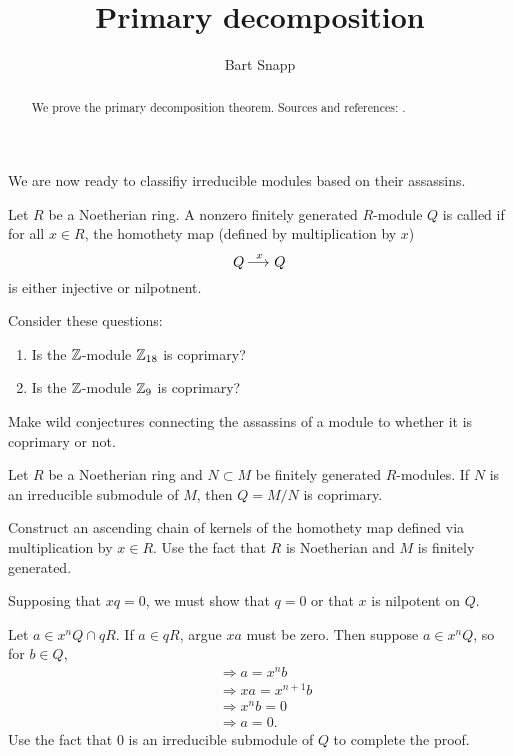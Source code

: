 \documentclass{ximera}
\author{Bart Snapp}
\title{Primary decomposition}
\begin{document}
\begin{abstract}
  We prove the primary decomposition theorem. Sources and references:
  \cite{AM1969, sD2008, dE1995, mR1995}.
\end{abstract}
\maketitle


We are now ready to classifiy irreducible modules based on their
assassins.

\begin{definition}
  Let $R$ be a Noetherian ring. A nonzero finitely generated
  $R$-module $Q$ is called  if for all $x\in R$, the
  homothety map (defined by multiplication by $x$)
  \[
  Q\mathop{\longrightarrow\,}\limits^x Q
  \]
  is either injective or nilpotnent.
\end{definition}

\begin{exercise}
  Consider these questions:
  \begin{enumerate}
  \item Is the $\mathbb Z$-module $\mathbb Z_{18}$ is coprimary?
  \item Is the $\mathbb Z$-module $\mathbb Z_{9}$ is coprimary?
  \end{enumerate}
  Make wild conjectures connecting the assassins of a module to
  whether it is coprimary or not.
\end{exercise}


\begin{lemma}\label{L:irrcoprimary}
  Let $R$ be a Noetherian ring and $N\subset M$ be finitely generated
  $R$-modules. If $N$ is an irreducible submodule of $M$, then $Q=M/N$
  is coprimary.
  \begin{sketch}
    Construct an ascending chain of kernels of the homothety map
    defined via multiplication by $x\in R$. Use the fact that $R$ is
    Noetherian and $M$ is finitely generated.
    
    Supposing that $x q= 0$, we must show that $q= 0$ or that $x$ is
    nilpotent on $Q$.

    Let $a \in x^n Q \cap qR$. If $a\in qR$, argue $xa$ must be zero.
    Then suppose $a\in x^n Q$, so for $b\in Q$,
    \begin{align*}
      &\Rightarrow a = x^nb\\
      &\Rightarrow xa = x^{n+1}b\\
      &\Rightarrow x^n b = 0\\
      &\Rightarrow a=0.
    \end{align*}
    Use the fact that $0$ is an irreducible submodule of $Q$ to
    complete the proof.
  \end{sketch}
\end{lemma}
\end{document}
